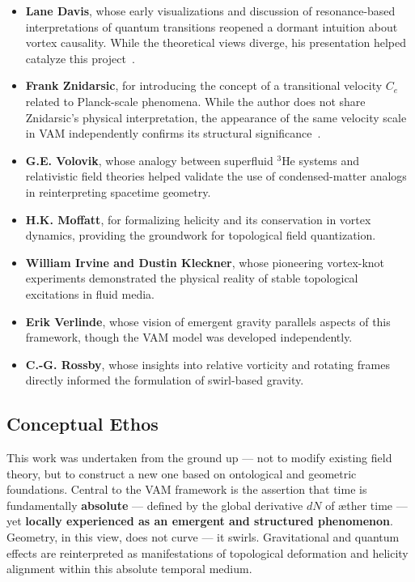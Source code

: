 \documentclass[12pt]{article}
\begin{document}
            \begin{itemize}
                \item \textbf{Lane Davis}, whose early visualizations and discussion of resonance-based interpretations of quantum transitions reopened a dormant intuition about vortex causality. While the theoretical views diverge, his presentation helped catalyze this project~\cite{davis2010cold}.
                \item \textbf{Frank Znidarsic}, for introducing the concept of a transitional velocity \( C_e \) related to Planck-scale phenomena. While the author does not share Znidarsic's physical interpretation, the appearance of the same velocity scale in VAM independently confirms its structural significance~\cite{znidarsic2012control}.
                \item \textbf{G.E. Volovik}, whose analogy between superfluid \( ^3 \)He systems and relativistic field theories helped validate the use of condensed-matter analogs in reinterpreting spacetime geometry.
                \item \textbf{H.K. Moffatt}, for formalizing helicity and its conservation in vortex dynamics, providing the groundwork for topological field quantization.
                \item \textbf{William Irvine and Dustin Kleckner}, whose pioneering vortex-knot experiments demonstrated the physical reality of stable topological excitations in fluid media.
                \item \textbf{Erik Verlinde}, whose vision of emergent gravity parallels aspects of this framework, though the VAM model was developed independently.
                \item \textbf{C.-G. Rossby}, whose insights into relative vorticity and rotating frames directly informed the formulation of swirl-based gravity.
            \end{itemize}
        
            \subsection*{Conceptual Ethos}
            This work was undertaken from the ground up — not to modify existing field theory, but to construct a new one based on ontological and geometric foundations. Central to the VAM framework is the assertion that time is fundamentally \textbf{absolute} — defined by the global derivative \( dN \) of æther time — yet \textbf{locally experienced as an emergent and structured phenomenon}. Geometry, in this view, does not curve — it swirls. Gravitational and quantum effects are reinterpreted as manifestations of topological deformation and helicity alignment within this absolute temporal medium.
\end{document}
